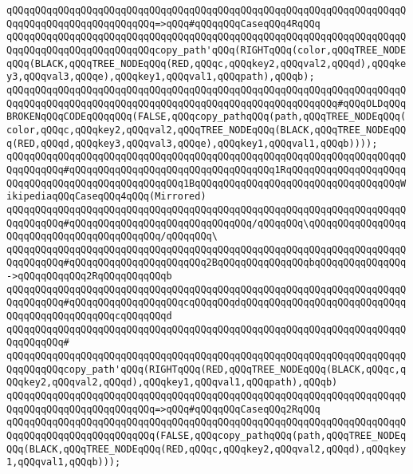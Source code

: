 \verb|qQQqqQQqqQQqqQQqqQQqqQQqqQQqqQQqqQQqqQQqqQQqqQQqqQQqqQQqqQQqqQQqqQQqqQQqqQQqqQQqqQQqqQQqqQQqqQQq=>qQQq#qQQqqQQqCaseqQQq4RqQQq|\newline
\verb|qQQqqQQqqQQqqQQqqQQqqQQqqQQqqQQqqQQqqQQqqQQqqQQqqQQqqQQqqQQqqQQqqQQqqQQqqQQqqQQqqQQqqQQqqQQqqQQqcopy_path'qQQq(RIGHTqQQq(color,qQQqTREE_NODEqQQq(BLACK,qQQqTREE_NODEqQQq(RED,qQQqc,qQQqkey2,qQQqval2,qQQqd),qQQqkey3,qQQqval3,qQQqe),qQQqkey1,qQQqval1,qQQqpath),qQQqb);|\newline
\newline
\verb|qQQqqQQqqQQqqQQqqQQqqQQqqQQqqQQqqQQqqQQqqQQqqQQqqQQqqQQqqQQqqQQqqQQqqQQqqQQqqQQqqQQqqQQqqQQqqQQqqQQqqQQqqQQqqQQqqQQqqQQqqQQqqQQq#qQQqOLDqQQqBROKENqQQqCODEqQQqqQQq(FALSE,qQQqcopy_pathqQQq(path,qQQqTREE_NODEqQQq(color,qQQqc,qQQqkey2,qQQqval2,qQQqTREE_NODEqQQq(BLACK,qQQqTREE_NODEqQQq(RED,qQQqd,qQQqkey3,qQQqval3,qQQqe),qQQqkey1,qQQqval1,qQQqb))));|\newline
\newline
\verb|qQQqqQQqqQQqqQQqqQQqqQQqqQQqqQQqqQQqqQQqqQQqqQQqqQQqqQQqqQQqqQQqqQQqqQQqqQQqqQQq#qQQqqQQqqQQqqQQqqQQqqQQqqQQqqQQqqQQq1RqQQqqQQqqQQqqQQqqQQqqQQqqQQqqQQqqQQqqQQqqQQqqQQqqQQq1BqQQqqQQqqQQqqQQqqQQqqQQqqQQqqQQqqQQqWikipediaqQQqCaseqQQq4qQQq(Mirrored)|\newline
\verb|qQQqqQQqqQQqqQQqqQQqqQQqqQQqqQQqqQQqqQQqqQQqqQQqqQQqqQQqqQQqqQQqqQQqqQQqqQQqqQQq#qQQqqQQqqQQqqQQqqQQqqQQqqQQqqQQq/qQQqqQQq\qQQqqQQqqQQqqQQqqQQqqQQqqQQqqQQqqQQqqQQqqQQq/qQQqqQQq\|\newline
\verb|qQQqqQQqqQQqqQQqqQQqqQQqqQQqqQQqqQQqqQQqqQQqqQQqqQQqqQQqqQQqqQQqqQQqqQQqqQQqqQQq#qQQqqQQqqQQqqQQqqQQqqQQq2BqQQqqQQqqQQqqQQqbqQQqqQQqqQQqqQQq->qQQqqQQqqQQq2RqQQqqQQqqQQqb|\newline
\verb|qQQqqQQqqQQqqQQqqQQqqQQqqQQqqQQqqQQqqQQqqQQqqQQqqQQqqQQqqQQqqQQqqQQqqQQqqQQqqQQq#qQQqqQQqqQQqqQQqqQQqcqQQqqQQqdqQQqqQQqqQQqqQQqqQQqqQQqqQQqqQQqqQQqqQQqqQQqqQQqcqQQqqQQqd|\newline
\verb|qQQqqQQqqQQqqQQqqQQqqQQqqQQqqQQqqQQqqQQqqQQqqQQqqQQqqQQqqQQqqQQqqQQqqQQqqQQqqQQq#|\newline
\verb|qQQqqQQqqQQqqQQqqQQqqQQqqQQqqQQqqQQqqQQqqQQqqQQqqQQqqQQqqQQqqQQqqQQqqQQqqQQqqQQqcopy_path'qQQq(RIGHTqQQq(RED,qQQqTREE_NODEqQQq(BLACK,qQQqc,qQQqkey2,qQQqval2,qQQqd),qQQqkey1,qQQqval1,qQQqpath),qQQqb)|\newline
\verb|qQQqqQQqqQQqqQQqqQQqqQQqqQQqqQQqqQQqqQQqqQQqqQQqqQQqqQQqqQQqqQQqqQQqqQQqqQQqqQQqqQQqqQQqqQQqqQQq=>qQQq#qQQqqQQqCaseqQQq2RqQQq|\newline
\verb|qQQqqQQqqQQqqQQqqQQqqQQqqQQqqQQqqQQqqQQqqQQqqQQqqQQqqQQqqQQqqQQqqQQqqQQqqQQqqQQqqQQqqQQqqQQqqQQq(FALSE,qQQqcopy_pathqQQq(path,qQQqTREE_NODEqQQq(BLACK,qQQqTREE_NODEqQQq(RED,qQQqc,qQQqkey2,qQQqval2,qQQqd),qQQqkey1,qQQqval1,qQQqb)));|\newline
